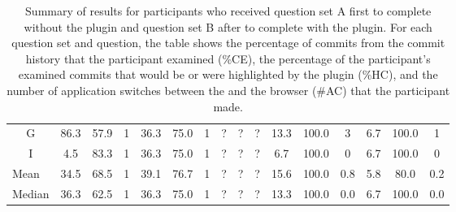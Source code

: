 \begin{landscape}
\begin{table}[p]
\begin{tabular}{@{}cccccccccccccccc@{}}
    G                          & 86.3  & 57.9  & 1     & 36.3                     & 75.0                     & 1                        & ?                        & ?                        & ?                        & 13.3 & 100.0                    & 3                        & 6.7                      & 100.0                    & 1                        \\
    I                          & 4.5   & 83.3  & 1     & 36.3                     & 75.0                     & 1                        & ?                        & ?                        & ?                        & 6.7  & 100.0                    & 0                        & 6.7                      & 100.0                    & 0                        \\ \midrule
    \multicolumn{1}{l}{Mean}   & 34.5  & 68.5  & 1     & 39.1                     & 76.7                     & 1                        & ?                        & ?                        & ?                        & 15.6 & 100.0                    & 0.8                      & 5.8                      & 80.0                     & 0.2                      \\
    \multicolumn{1}{l}{Median} & 36.3  & 62.5  & 1     & 36.3                     & 75.0                     & 1                        & ?                        & ?                        & ?                        & 13.3 & 100.0                    & 0.0                      & 6.7                      & 100.0                    & 0.0                      \\ \bottomrule
  \end{tabular}
  \caption{
    Summary of results for participants who received question set A first to complete without the plugin and question set B after to complete with the plugin.
    For each question set and question, the table shows the percentage of commits from the commit history that the participant examined (\%CE), 
    the percentage of the participant's examined commits that would be or were highlighted by the plugin (\%HC),
    and the number of application switches between the  and the browser (\#AC) that the participant made.
  }
  \label{tab:Results-Quantitative-AB}
\end{table}
\end{landscape}

